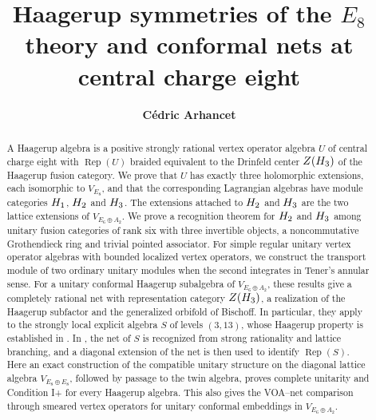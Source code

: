 \documentclass[leqno]{article}
\let\cal\relax
\newcommand{\cal}{\mathcal}
\DeclareMathOperator{\Rep}{Rep} %
\numberwithin{equation}{section}
\begin{document}
\title{\bfseries{Haagerup symmetries of the $E_8$ theory and conformal nets at central charge eight}}
\date{}
\author{\bfseries{C\'edric Arhancet}}
\maketitle


\begin{abstract}
A Haagerup algebra is a positive strongly rational vertex operator algebra $U$ of central charge eight with $\Rep(U)$ braided equivalent to the Drinfeld center $Z(\cal H_3)$ of the Haagerup fusion category. We prove that $U$ has exactly three holomorphic extensions, each isomorphic to $V_{E_8}$, and that the corresponding Lagrangian algebras have module categories $\cal H_1$, $\cal H_2$ and $\cal H_3$. The extensions attached to $\cal H_2$ and $\cal H_3$ are the two lattice extensions of $V_{E_6 \oplus A_2}$. We prove a recognition theorem for $\cal H_2$ and $\cal H_3$ among unitary fusion categories of rank six with three invertible objects, a noncommutative Grothendieck ring and trivial pointed associator. For simple regular unitary vertex operator algebras with bounded localized vertex operators, we construct the transport module of two ordinary unitary modules when the second integrates in Tener's annular sense. For a unitary conformal Haagerup subalgebra of $V_{E_6 \oplus A_2}$, these results give a completely rational net with representation category $Z(\cal H_3)$, a realization of the Haagerup subfactor and the generalized orbifold of Bischoff. In particular, they apply to the strongly local explicit algebra $S$ of levels $(3,13)$, whose Haagerup property is established in \cite[Theorem 6.1]{ArhIII}. In \cite{ArhIII}, the net of $S$ is recognized from strong rationality and lattice branching, and a diagonal extension of the net is then used to identify $\Rep(S)$. Here an exact construction of the compatible unitary structure on the diagonal lattice algebra $V_{E_8 \oplus E_8}$, followed by passage to the twin algebra, proves complete unitarity and Condition I+ for every Haagerup algebra. This also gives the VOA--net comparison through smeared vertex operators for unitary conformal embeddings in $V_{E_6 \oplus A_2}$.
\end{abstract}

\end{document}

